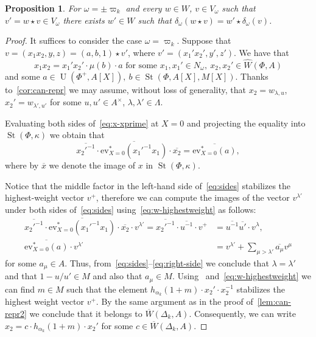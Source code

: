 \documentclass[oneside, 10pt]{amsart}
\DeclareMathOperator{\St}{St}
\DeclareMathOperator{\UU}{U}
\newcommand{\StW}{\widehat{W}}
\numberwithin{equation}{section}
\numberwithin{thm}{section}
\numberwithin{lemma}{section}
\newtheorem{prop}[lemma]{Proposition}
\theoremstyle{definition}
\theoremstyle{remark}
\begin{document}
\begin{prop} \label{prop:v-correctness2}
For $\omega = \pm \varpi_k$ and every $w \in W$, $v \in V_\omega$ such that $v' = w \star v \in V_\omega$ there exists $w' \in W$ such that
$\delta_\omega(w \star v) = w' \star \delta_\omega(v)$.
\end{prop}
\begin{proof}
It suffices to consider the case $\omega = \varpi_k$.
Suppose that $v = (x_1 x_2, y, z) = (a, b, 1) \star v'$, where $v' = (x_1' x_2', y', z')$.
We have that
\begin{equation}\label{eq:x-xprime} x_1 x_2 = x_1' x_2' \cdot \mu(b) \cdot a  \text{ for some }x_1, x_1' \in N_\omega,\ x_2, x_2' \in \StW(\Phi, A) \end{equation}
and some $a \in \UU(\Phi^+, A[X]),\ b \in \St(\Phi, A[X], M[X])$.
Thanks to~\cref{cor:can-repr} we may assume, without loss of generality, that $x_2 = w_{\lambda, u}$, $x_2' = w_{\lambda', u'}$
for some $u, u' \in A^\times$, $\lambda, \lambda' \in \Lambda$.

Evaluating both sides of~\eqref{eq:x-xprime} at $X=0$ and projecting the equality into $\St(\Phi, \kappa)$ we obtain that
\begin{equation} \label{eq:sides}
\overline{{x_2'}^{-1}} \cdot \overline{\mathrm{ev}_{X=0}^*({x_1'}^{-1}x_1)} \cdot \overline{x_2} = \overline{\mathrm{ev}_{X=0}^*(a)},
\end{equation}
where by $\overline{x}$ we denote the image of $x$ in $\St(\Phi, \kappa)$.

Notice that the middle factor in the left-hand side of~\eqref{eq:sides} stabilizes the highest-weight vector $v^+$,
therefore we can compute the images of the vector $v^{\lambda'}$ under both sides of~\eqref{eq:sides} using~\eqref{eq:w-highestweight} as follows:
\begin{align} \overline{{x_2'}^{-1}} \cdot \overline{\mathrm{ev}_{X=0}^*({x_1'}^{-1}x_1)} \cdot \overline{x_2} \cdot v^{\lambda'} = \overline{{x_2'}^{-1}} \cdot \overline{{u}^{-1}} \cdot v^+ &= \overline{u^{-1}}\overline{u'} \cdot v^\lambda, \\
\overline{\mathrm{ev}_{X=0}^*(a)} \cdot v^{\lambda'} &= v^{\lambda'} + \sum_{\mu > \lambda'} \overline{a_\mu} v^\mu \label{eq:right-side} \end{align}
for some $a_\mu \in A$.
Thus, from~\eqref{eq:sides}--\eqref{eq:right-side} we conclude that $\lambda = \lambda'$ and that $1 - u/u' \in M$ and also that $a_\mu \in M$.
Using~\cite[Lemma~7]{V00} and~\eqref{eq:w-highestweight} we can find $m \in M$ such that the element
$h_{\alpha_k}(1+m) \cdot x_2' \cdot x_2^{-1}$ stabilizes the highest weight vector $v^+$.
By the same argument as in the proof of~\cref{lem:can-repr2} we conclude that it belongs to $\overline{W}(\Delta_k, A)$.
Consequently, we can write $x_2 = c \cdot h_{\alpha_k}(1+m) \cdot x_2'$ for some $c \in \overline{W}(\Delta_k, A)$.


\end{proof}
\end{document}
